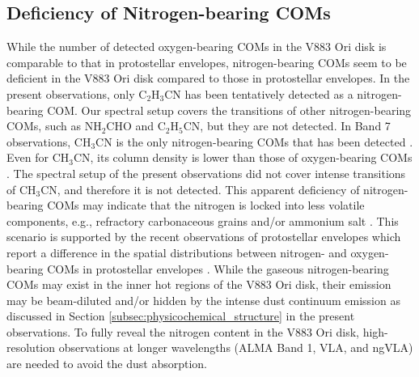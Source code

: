 \documentclass[linenumbers, twocolumn, twocolappendix, astrosymb, times]{aastex631}
\begin{document}
\subsection{Deficiency of Nitrogen-bearing COMs}
While the number of detected oxygen-bearing COMs in the V883 Ori disk is comparable to that in protostellar envelopes, nitrogen-bearing COMs seem to be deficient in the V883 Ori disk compared to those in protostellar envelopes. In the present observations, 
only C$_2$H$_3$CN has been tentatively detected as a nitrogen-bearing COM. Our spectral setup covers the transitions of other nitrogen-bearing COMs, such as NH$_2$CHO and C$_2$H$_5$CN, but they are not detected. In Band 7 observations, CH$_3$CN is the only nitrogen-bearing COMs that has been detected \citep{Lee2019}. Even for CH$_3$CN, its column density is lower than those of oxygen-bearing COMs \citep{Lee2019}. The spectral setup of the present observations did not cover intense transitions of CH$_3$CN, and therefore it is not detected. \textrm{This apparent deficiency of nitrogen-bearing COMs may indicate that the nitrogen is locked into less volatile components, e.g., refractory carbonaceous grains \citep{vantHoff2020} and/or ammonium salt \citep{Poch2020, Altwegg2020}. This scenario is supported by the recent observations of protostellar envelopes which report a difference in the spatial distributions between nitrogen- and oxygen-bearing COMs in protostellar envelopes \citep{Nazari2023, Okoda2021, Okoda2022}. While the gaseous nitrogen-bearing COMs may exist in the inner hot regions of the V883 Ori disk, their emission may be beam-diluted and/or hidden by the intense dust continuum emission as discussed in Section \ref{subsec:physicochemical_structure} in the present observations.} To fully reveal the nitrogen content in the V883 Ori disk, high-resolution observations at longer wavelengths (ALMA Band 1, VLA, and ngVLA) are needed to avoid the dust absorption.   
\end{document}
